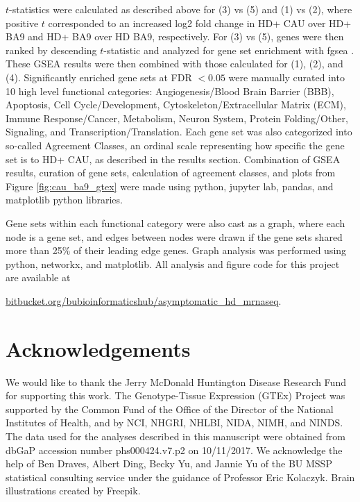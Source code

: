 \documentclass[fleqn,10pt,table]{wlscirep}
\begin{document}
$t$-statistics were calculated as described above for (3) vs (5) and (1) vs (2), where positive $t$ corresponded to an increased log2 fold change in HD+ CAU over HD+ BA9 and HD+ BA9 over HD BA9, respectively.
For (3) vs (5), genes were then ranked by descending $t$-statistic and analyzed for gene set enrichment with fgsea \cite{Sergushichev2016-hz}.
These GSEA results were then combined with those calculated for (1), (2), and (4).
Significantly enriched gene sets at FDR $<0.05$ were manually curated into 10 high level functional categories: Angiogenesis/Blood Brain Barrier (BBB), Apoptosis, Cell Cycle/Development, Cytoskeleton/Extracellular Matrix (ECM), Immune Response/Cancer, Metabolism, Neuron System, Protein Folding/Other, Signaling, and Transcription/Translation.
Each gene set was also categorized into so-called Agreement Classes, an ordinal scale representing how specific the gene set is to HD+ CAU, as described in the results section.
Combination of GSEA results, curation of gene sets, calculation of agreement classes, and plots from Figure \ref{fig:cau_ba9_gtex} were made using python, jupyter lab, pandas, and matplotlib python libraries.

Gene sets within each functional category were also cast as a graph, where each node is a gene set, and edges between nodes were drawn if the gene sets shared more than 25\% of their leading edge genes.
Graph analysis was performed using python, networkx, and matplotlib.
All analysis and figure code for this project are available at

\href{https://bitbucket.org/bubioinformaticshub/asymptomatic_hd_mrnaseq}{bitbucket.org/bubioinformaticshub/asymptomatic\_hd\_mrnaseq}.



\section{Acknowledgements}

We would like to thank the Jerry McDonald Huntington Disease Research Fund for supporting this work.
The Genotype-Tissue Expression (GTEx) Project was supported by the Common Fund of the Office of the Director of the National Institutes of Health, and by NCI, NHGRI, NHLBI, NIDA, NIMH, and NINDS.
The data used for the analyses described in this manuscript were obtained from dbGaP accession number phs000424.v7.p2 on 10/11/2017.
We acknowledge the help of Ben Draves, Albert Ding, Becky Yu, and Jannie Yu of the BU MSSP statistical consulting service under the guidance of Professor Eric Kolaczyk. 
Brain illustrations created by Freepik.


\end{document}
